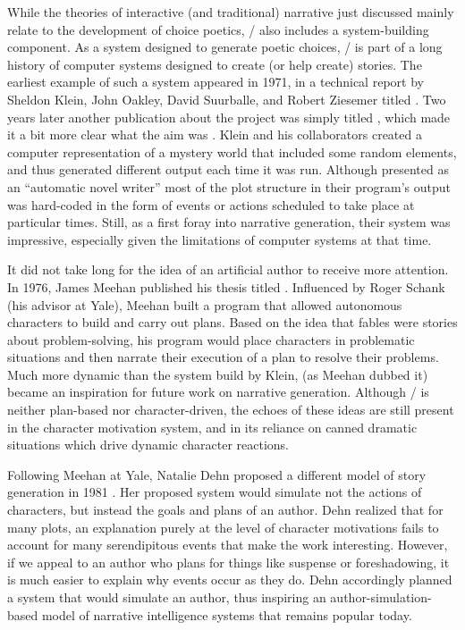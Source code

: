 While the theories of interactive (and traditional) narrative just discussed mainly relate to the development of choice poetics, \dunyazad/ also includes a system-building component.
%
As a system designed to generate poetic choices, \dunyazad/ is part of a long history of computer systems designed to create (or help create) stories.
%
The earliest example of such a system appeared in 1971, in a technical report by Sheldon Klein, John Oakley, David Suurballe, and Robert Ziesemer titled  \citep{Klein1971}.
%
Two years later another publication about the project was simply titled , which made it a bit more clear what the aim was \citep{Klein1973}.
%
Klein and his collaborators created a computer representation of a mystery world that included some random elements, and thus generated different output each time it was run.
%
Although presented as an ``automatic novel writer'' most of the plot structure in their program's output was hard-coded in the form of events or actions scheduled to take place at particular times.
%
Still, as a first foray into narrative generation, their system was impressive, especially given the limitations of computer systems at that time.


It did not take long for the idea of an artificial author to receive more attention.
%
In 1976, James Meehan published his thesis titled  \citep{Meehan1976}.
%
Influenced by Roger Schank (his advisor at Yale), Meehan built a program that allowed autonomous characters to build and carry out plans.
%
Based on the idea that fables were stories about problem-solving, his program would place characters in problematic situations and then narrate their execution of a plan to resolve their problems.
%
Much more dynamic than the system build by Klein,  (as Meehan dubbed it) became an inspiration for future work on narrative generation.
%
Although \dunyazad/ is neither plan-based nor character-driven, the echoes of these ideas are still present in the character motivation system, and in its reliance on canned dramatic situations which drive dynamic character reactions.


Following Meehan at Yale, Natalie Dehn proposed a different model of story generation in 1981 \citep{Dehn1981}.
%
Her proposed system  would simulate not the actions of characters, but instead the goals and plans of an author.
%
Dehn realized that for many plots, an explanation purely at the level of character motivations fails to account for many serendipitous events that make the work interesting.
%
However, if we appeal to an author who plans for things like suspense or foreshadowing, it is much easier to explain why events occur as they do.
%
Dehn accordingly planned a system that would simulate an author, thus inspiring an author-simulation-based model of narrative intelligence systems that remains popular today.


